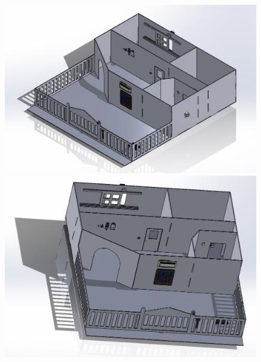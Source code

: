 \begin{figure}[htbp]
    \centering
    \begin{minipage}[t]{0.2\textwidth}
        \centering
        \includegraphics[width=\textwidth]{figs/Smart_Home1.jpg}
    \end{minipage}
    \hfill
    \begin{minipage}[t]{0.2\textwidth}
        \centering
        \includegraphics[width=\textwidth]{figs/Smart_Home2.jpg}
    \end{minipage}
    \hfill
    \begin{minipage}[t]{0.2\textwidth}
        \centering

\end{minipage}
\end{figure}
